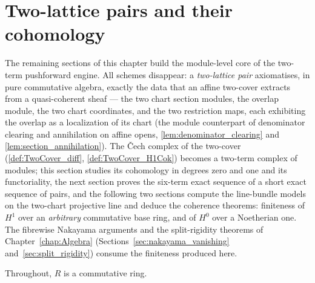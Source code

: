 \section{Two-lattice pairs and their cohomology}
\label{sec:two_lattice_pairs}

The remaining sections of this chapter build the module-level core of the two-term
pushforward engine. All schemes disappear: a \emph{two-lattice pair} axiomatises, in pure
commutative algebra, exactly the data that an affine two-cover extracts from a
quasi-coherent sheaf --- the two chart section modules, the overlap module, the two chart
coordinates, and the two restriction maps, each exhibiting the overlap as a localization
of its chart (the module counterpart of denominator clearing and annihilation on affine
opens, \ref{lem:denominator_clearing} and \ref{lem:section_annihilation}). The \v{C}ech
complex of the two-cover (\ref{def:TwoCover_diff}, \ref{def:TwoCover_H1Cok}) becomes a
two-term complex of modules; this section studies its cohomology in degrees zero and one
and its functoriality, the next section proves the six-term exact sequence of a short
exact sequence of pairs, and the following two sections compute the line-bundle models on
the two-chart projective line and deduce the coherence theorems: finiteness of \(H^1\)
over an \emph{arbitrary} commutative base ring, and of \(H^0\) over a Noetherian one. The
fibrewise Nakayama arguments and the split-rigidity theorems of
Chapter~\ref{chap:Algebra} (Sections~\ref{sec:nakayama_vanishing}
and~\ref{sec:split_rigidity}) consume the finiteness produced here.

Throughout, \(R\) is a commutative ring.

